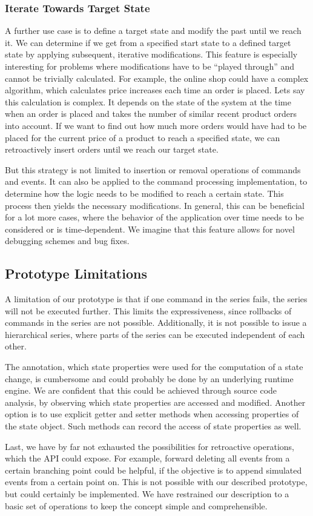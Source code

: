 \subsubsection{Iterate Towards Target State}
A further use case is to define a target state and modify the past until we 
reach it. We can determine if we get from a specified start state to a defined 
target state by applying subsequent, iterative modifications.
This feature is especially interesting for problems where modifications have 
to be ``played through'' and cannot be trivially calculated. 
%
For example, the online shop could have a complex algorithm, which calculates
price increases each time an order is placed.
Lets say this calculation is complex. It depends on the state of the system at 
the time when an order is placed and takes the number of similar recent product 
orders into account. 
If we want to find out how much more orders would have had to be placed for
the current price of a product to reach a specified state, we can retroactively
insert orders until we reach our target state.

But this strategy is not limited to insertion or removal operations of commands 
and events. It can also be applied to the command processing implementation, to 
determine how the logic needs to be modified to reach a certain state. This 
process then yields the necessary modifications.
In general, this can be beneficial for a lot more cases, where the behavior of 
the application over time needs to be considered or is time-dependent.
We imagine that this feature allows for novel debugging schemes and bug fixes. 

\subsection{Prototype Limitations}
A limitation of our prototype is that if one command in the series fails, the 
series will not be executed further. This limits the expressiveness, since 
rollbacks of commands in the series are not possible.
Additionally, it is not possible to issue a hierarchical series, where parts of
the series can be executed independent of each other. 

The annotation, which state properties were used for the computation of a
state change, is cumbersome and could probably be done by an underlying 
runtime engine. We are confident that this could be achieved through source 
code analysis, by observing which state properties are accessed and modified.
Another option is to use explicit getter and setter methods when accessing 
properties of the state object.
Such methods can record the access of state properties as well.

Last, we have by far not exhausted the possibilities for retroactive operations,
which the API could expose. For example, forward deleting all events from a certain
branching point could be helpful, if the objective is to append simulated
events from a certain point on. This is not possible with our described
prototype, but could certainly be implemented. We have restrained our description
to a basic set of operations to keep the concept simple and comprehensible.
